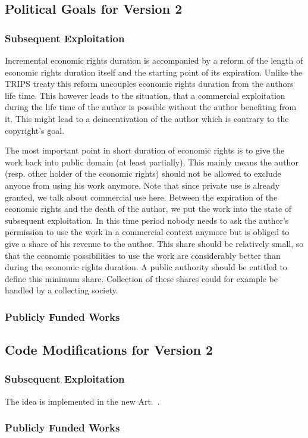 \subsection{Political Goals for Version 2}

\subsubsection{Subsequent Exploitation}

Incremental economic rights duration is accompanied by a reform of the length of economic rights duration itself and the starting point of its expiration. Unlike the TRIPS treaty this reform uncouples economic rights duration from the authors life time. This however leads to the situation, that a commercial exploitation during the life time of the author is possible without the author benefiting from it. This might lead to a deincentivation of the author which is contrary to the copyright's goal.

The most important point in short duration of economic rights is to give the work back into public domain (at least partially). This mainly means the author (resp. other holder of the economic rights) should not be allowed to exclude anyone from using his work anymore. Note that since private use is already granted, we talk about commercial use here. Between the expiration of the economic rights and the death of the author, we put the work into the state of subsequent exploitation. In this time period nobody needs to ask the author's permission to use the work in a commercial context anymore but is obliged to give a share of his revenue to the author. This share should be relatively small, so that the economic possibilities to use the work are considerably better than during the economic rights duration. A public authority should be entitled to define this minimum share. Collection of these shares could for example be handled by a collecting society.

\subsubsection{Publicly Funded Works}



\subsection{Code Modifications for Version 2}

\subsubsection{Subsequent Exploitation}

The idea is implemented in the new Art.~.

\subsubsection{Publicly Funded Works}